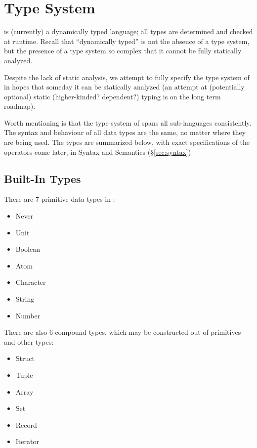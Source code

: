 \section{Type System}

\Trilogy{} is (currently) a dynamically typed language; all types are determined
and checked at runtime. Recall that ``dynamically typed'' is not the absence of
a type system, but the presence of a type system so complex that it cannot be
fully statically analyzed.

Despite the lack of static analysis, we attempt to fully specify the type system
of \Trilogy{} in hopes that someday it can be statically analyzed (an attempt at
(potentially optional) static (higher-kinded? dependent?) typing is on the long
term roadmap).

Worth mentioning is that the type system of \Trilogy{} spans all sub-languages
consistently. The syntax and behaviour of all data types are the same, no matter
where they are being used. The types are summarized below, with exact specifications
of the operators come later, in Syntax and Semantics (\S\ref{sec:syntax})

\subsection{Built-In Types}

There are 7 primitive data types in \Trilogy{}:

\begin{itemize}
    \item Never
    \item Unit
    \item Boolean
    \item Atom
    \item Character
    \item String
    \item Number
\end{itemize}

\noindent
There are also 6 compound types, which may be constructed out of primitives
and other types:

\begin{itemize}
    \item Struct
    \item Tuple
    \item Array
    \item Set
    \item Record
    \item Iterator
\end{itemize}

